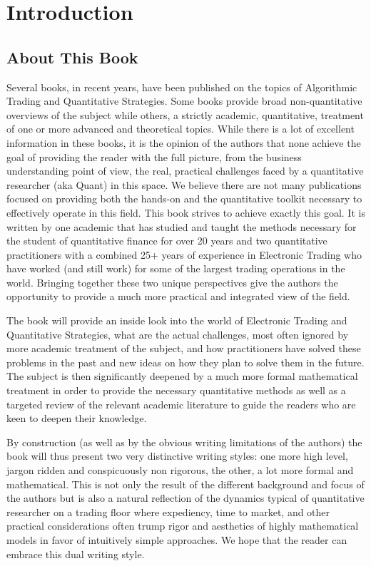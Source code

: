 \chapter{Introduction}\label{chap:ch_intro}
\section{About This Book}

Several books, in recent years, have been published  on the topics of Algorithmic Trading and Quantitative Strategies. Some books provide broad non-quantitative overviews of the subject while others, a strictly academic, quantitative, treatment of one or more advanced and theoretical topics. While there is a lot of excellent information in these books, it is the opinion of the authors that none achieve the goal of providing the reader with the full picture, from the business understanding point of view, the real, practical challenges faced by a quantitative researcher (aka Quant) in this space. We believe there are not many publications focused on providing both the hands-on and the quantitative toolkit necessary to effectively operate in this field. This book strives to achieve exactly this goal. It is written by one academic that has studied and taught the methods necessary for the student of quantitative finance for over 20 years and two quantitative practitioners with a combined 25+ years of experience in Electronic Trading who have worked (and still work) for some of the largest trading operations in the world. Bringing together these two unique perspectives give the authors the opportunity to provide a much more practical and integrated view of the field.


The book will provide an inside look into the world of Electronic Trading and Quantitative Strategies, what are the actual challenges, most often ignored by more academic treatment of the subject, and how practitioners have solved these problems in the past and new ideas on how they plan to solve them in the future. The subject is then significantly deepened by a much more formal mathematical treatment in order to provide the necessary quantitative methods as well as a targeted review of the relevant academic literature to guide the readers who are keen to deepen their knowledge.


By construction (as well as by the obvious writing limitations of the authors) the book will thus present two very distinctive writing styles: one more high level, jargon ridden and conspicuously non rigorous, the other, a lot more formal and mathematical. This is not only the result of the different background and focus of the authors but is also a natural reflection of the dynamics typical of quantitative researcher on a trading floor where expediency, time to market, and other practical considerations often trump rigor and aesthetics of highly mathematical models in favor of intuitively simple approaches. We hope that the reader can embrace this dual writing style.


